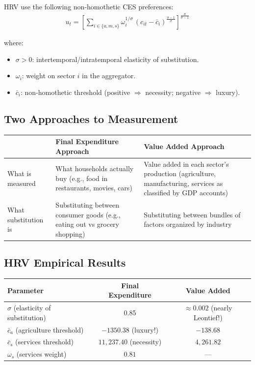\documentclass[a4paper,11pt]{article}
\begin{document}
HRV use the following non-homothetic CES preferences:
\begin{align*}
u_t = \left[\sum_{i \in \{a,m,s\}} \omega_i^{1/\sigma}\,(c_{it} - \bar{c}_i)^{\frac{\sigma-1}{\sigma}}\right]^{\frac{\sigma}{\sigma-1}}
\tag{HRV Utility}
\end{align*}

where:
\begin{itemize}[nosep]
    \item $\sigma > 0$: intertemporal/intratemporal elasticity of substitution.
    \item $\omega_i$: weight on sector $i$ in the aggregator.
    \item $\bar{c}_i$: non-homothetic threshold (positive $\Rightarrow$ necessity; negative $\Rightarrow$ luxury).
\end{itemize}

\subsection*{Two Approaches to Measurement}

\begin{center}
\begin{tabular}{p{4cm}p{5cm}p{5cm}}
\toprule
\textbf{} & \textbf{Final Expenditure Approach} & \textbf{Value Added Approach} \\
\midrule
What is measured & What households actually buy (e.g., food in restaurants, movies, cars) & Value added in each sector's production (agriculture, manufacturing, services as classified by GDP accounts) \\
What substitution is & Substituting between consumer goods (e.g., eating out vs grocery shopping) & Substituting between bundles of factors organized by industry \\
\bottomrule
\end{tabular}
\end{center}

\subsection*{HRV Empirical Results}

\begin{center}
\begin{tabular}{lcc}
\toprule
\textbf{Parameter} & \textbf{Final Expenditure} & \textbf{Value Added} \\
\midrule
$\sigma$ (elasticity of substitution) & 0.85 & $\approx 0.002$ (nearly Leontief!) \\
$\bar{c}_a$ (agriculture threshold) & $-1350.38$ (luxury!) & $-138.68$ \\
$\bar{c}_s$ (services threshold) & $11{,}237.40$ (necessity) & $4{,}261.82$ \\
$\omega_s$ (services weight) & $0.81$ & --- \\
\bottomrule
\end{tabular}
\end{center}
\end{document}

